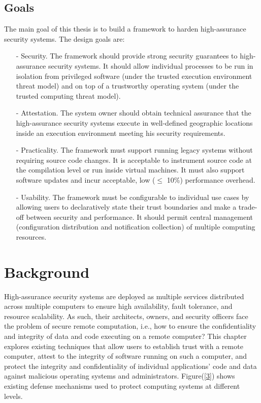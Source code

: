 \documentclass[11pt,twoside]{book}
\begin{document}
\subsection{Goals}
\raggedright The main goal of this thesis is to build a framework to harden high-assurance security systems. The design goals are:

\begin{itemize}
    \item[-] Security. The framework should provide strong security guarantees to high-assurance security systems. It should allow individual processes to be run in isolation from privileged software (under the trusted execution environment threat model) and on top of a trustworthy operating system (under the trusted computing threat model). 
    \item[-] Attestation. The system owner should obtain technical assurance that the high-assurance security systems execute in well-defined geographic locations inside an execution environment meeting his security requirements. 
    \item[-] Practicality. The framework must support running legacy systems without requiring source code changes. It is acceptable to instrument source code at the compilation level or run inside virtual machines. It must also support software updates and incur acceptable, low ($\le$ 10\%) performance overhead.
    \item[-] Usability. The framework must be configurable to individual use cases by allowing users to declaratively state their trust boundaries and make a trade-off between security and performance. It should permit central management (configuration distribution and notification collection) of multiple computing resources.
\end{itemize}

\section{Background}
\raggedright  High-assurance security systems are deployed as multiple services distributed across multiple computers to ensure high availability, fault tolerance, and resource scalability. As such, their architects, owners, and security officers face the problem of secure remote computation, i.e., how to ensure the confidentiality and integrity of data and code executing on a remote computer? This chapter explores existing techniques that allow users to establish trust with a remote computer, attest to the integrity of software running on such a computer, and protect the integrity and confidentiality of individual applications’ code and data against malicious operating systems and administrators. Figure(\ref{3}) shows existing defense mechanisms used to protect computing systems at different levels. 
\end{document}
